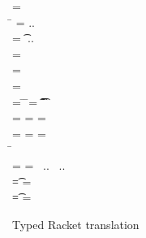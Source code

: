 \documentclass{tex/llncs}
\begin{document}
\begin{figure}[!b]

\hrulefill

\medskip

 \small
	\begin{minipage}{12cm}  
	\begin{tabbing}
		 =  \\
		\hspace{4.6cm}\= \WHERE\HS 
		\mdp[1] = \src{\Mdef\m\x\t\tp{\ep[1]}} ..\HS\HS \\
		\>\qquad\HS\HS\HS\HS\md[1] = \Mdef\m\x\t\tp{\e[1]} ..\HS\HS \\
		\>\qquad\HS\HS\HS\HS \ep[1] = \TRG{\e[1]}{\x:\t\,\this:\C}
		\\
		\TRG\x\Env = \src{\x}
		\\
		\TRG{\FRead\f}\Env  = \src{\FRead\f}
		\\
		\TRG{\FWrite\f\e}\Env =  \src{\FWrite\f\ep} 
		\>\WHERE\HS
		\= \TypeCk\K{\this}\C \HS\HS
		\=  \ep = \TAG\e\Env\t \HS\HS
		\= \Ftype\f\t\In\App\K\C
		\\
		\TRG{\Call{\e[1]}\m{\e[2]}}\Env = \src{\DynCall{\ep[1]}\m{\ep[2]}}
		\>\WHERE \> \TypeCk{\K,\Env}{\e[1]}\any \HS
		\> \ep[1] = \TRG{\e[1]}\Env \HS
		\> \ep[2] = \TAG{\e[2]}\Env\any
		\\
		\TRG{\Call{\e[1]}\m{\e[2]}}\Env = \src{\KCall{\ep[1]}\m{\ep[2]}{\D[1]}{\D[2]}}
		\>\WHERE \> \TypeCk{\K,\Env}{\e[1]}\C 
		\> \ep[1] = \TRG{\e[1]}\Env\HS\HS
		\> \ep[2] = \TAG{\e[2]}\Env{\D[1]} \HS\HS \\
		\> \> \=  \Mtype\m{\D[1]}{\D[2]}\In\App\K\C 
		\\
		\Env =  \src{\New\C{\ep[1]..}}
		\>\WHERE \>  \ep[1] = \TAG{\e[1]}\Env{\t[1]} ~..
		\> \HS\HS\HS\HS\HS\HS\HS\HS\HS\HS \Ftype{\f[1]}{\t[1]}\In\App\K\C ~..
		\\
		\TAG\e\Env\t = \src\ep
		\> \WHERE\> \TypeCk{\K,\Env}\e\tp \HS
		\>\HS\HS\HS\HS\HS\HS\HS\HS\HS\HS \EM{\K\vdash \t \Sub \tp}
		\>\ep = \TRG\e\Env
		\\
		\TAG\e\Env\t = \src{\BehCast\t\e}
		\>\WHERE\> \TypeCk{\K,\Env}\e\tp \HS 
		\>\HS\HS\HS\HS\HS\HS\HS\HS\HS\HS  \EM{\K\vdash \t \not \Sub \tp}
		\> \ep = \TRG\e\Env
	\end{tabbing}
\end{minipage}

\medskip

\hrulefill
\caption{Typed Racket translation}\label{trtr}
\end{figure}
\end{document}
